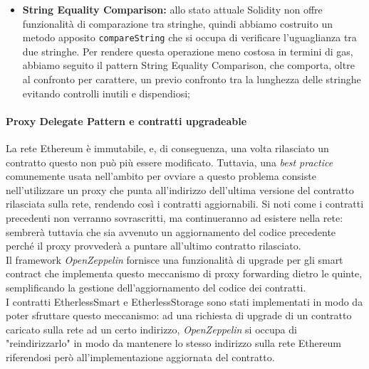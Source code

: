 \begin{itemize}
    \item \textbf{String Equality Comparison:} allo stato attuale Solidity non offre funzionalità di comparazione tra stringhe, quindi abbiamo costruito un metodo apposito \texttt{compareString} che si occupa di verificare l'uguaglianza tra due stringhe. Per rendere questa operazione meno costosa in termini di gas, abbiamo seguito il pattern String Equality Comparison, che comporta, oltre al confronto per carattere, un previo confronto tra la lunghezza delle stringhe evitando controlli inutili e dispendiosi;
  \end{itemize}

  \paragraph{Proxy Delegate Pattern e contratti upgradeable}
    La rete Ethereum è immutabile, e, di conseguenza, una volta rilasciato un contratto questo non può più essere modificato. Tuttavia, una \textit{best practice} comunemente usata nell'ambito per ovviare a questo problema consiste nell'utilizzare un proxy che punta all'indirizzo dell'ultima versione del contratto rilasciata sulla rete, rendendo così i contratti aggiornabili. Si noti come i contratti precedenti non verranno sovrascritti, ma continueranno ad esistere nella rete: sembrerà tuttavia che sia avvenuto un aggiornamento del codice precedente perché il proxy provvederà a puntare all'ultimo contratto rilasciato. \\
    Il framework \textit{OpenZeppelin} fornisce una funzionalità di upgrade per gli smart contract che implementa questo meccanismo di proxy forwarding dietro le quinte, semplificando la gestione dell'aggiornamento del codice dei contratti. \\
    I contratti EtherlessSmart e EtherlessStorage sono stati implementati in modo da poter sfruttare questo meccanismo: ad una richiesta di upgrade di un contratto caricato sulla rete ad un certo indirizzo, \textit{OpenZeppelin} si occupa di "reindirizzarlo" in modo da mantenere lo stesso indirizzo sulla rete Ethereum riferendosi però all'implementazione aggiornata del contratto.

